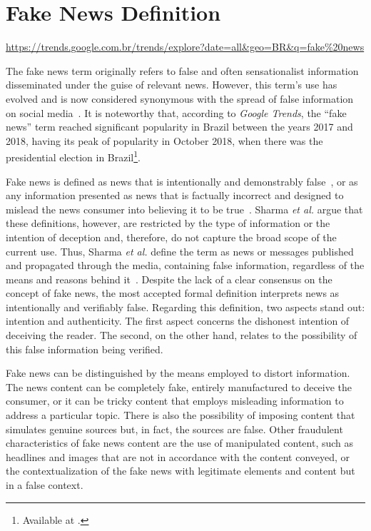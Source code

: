 \documentclass{ieeeaccess}
\begin{document}
\section{Fake News Definition}
\label{sec:def}

\urldef{\googlefakenews}\url{https://trends.google.com.br/trends/explore?date=all&geo=BR&q=fake%20news}

The fake news term originally refers to false and often sensationalist information disseminated under the guise of relevant news. However, this term's use has evolved and is now considered synonymous with the spread of false information on social media~\cite{sharma2019combating}. It is noteworthy that, according to \textit{Google Trends}, the ``fake news'' term reached significant popularity in Brazil between the years 2017 and 2018, having its peak of popularity in October 2018, when there was the presidential election in Brazil\footnote{Available at \googlefakenews.}. 

Fake news is defined as news that is intentionally and demonstrably false~\cite{zhou2018fake}, or as any information presented as news that is factually incorrect and designed to mislead the news consumer into believing it to be true~\cite{golbeck2018 }. Sharma {\it et al.} argue that these definitions, however, are restricted by the type of information or the intention of deception and, therefore, do not capture the broad scope of the current use. Thus, Sharma {\it et al.} define the term as news or messages published and propagated through the media, containing false information, regardless of the means and reasons behind it~\cite{sharma2019combating}. Despite the lack of a clear consensus on the concept of fake news, the most accepted formal definition interprets news as intentionally and verifiably false. Regarding this definition, two aspects stand out: intention and authenticity. The first aspect concerns the dishonest intention of deceiving the reader. The second, on the other hand, relates to the possibility of this false information being verified.

Fake news can be distinguished by the means employed to distort information. The news content can be completely fake, entirely manufactured to deceive the consumer, or it can be tricky content that employs misleading information to address a particular topic. There is also the possibility of imposing content that simulates genuine sources but, in fact, the sources are false. Other fraudulent characteristics of fake news content are the use of manipulated content, such as headlines and images that are not in accordance with the content conveyed, or the contextualization of the fake news with legitimate elements and content but in a false context.
\end{document}
